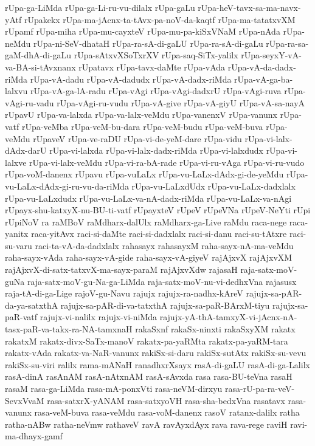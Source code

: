 {rUpa-ga-LiMda
rUpa-ga-Li-ru-vu-dilalx
rUpa-gaLu
rUpa-heV-tavx-sa-ma-navx-yAtf
rUpakekx
rUpa-ma-jAcnx-ta-tAvx-pa-noV-da-kaqtf
rUpa-ma-tatatxvXM
rUpamf
rUpa-miha
rUpa-mu-cayxteV
rUpa-mu-pa-kiSxVNaM
rUpa-nAda
rUpa-neMdu
rUpa-ni-SeV-dhataH
rUpa-ra-sA-di-gaLU
rUpa-ra-sA-di-gaLu
rUpa-ra-sa-gaM-dhA-di-gaLu
rUpa-sAtxvXSoTxrXV
rUpa-saq-SiTx-yalilx
rUpa-seyxY-vA-va-BA-si-tAvxnanx
rUpatavx
rUpa-tavx-daMte
rUpa-vAda
rUpa-vA-da-dadx-riMda
rUpa-vA-dadu
rUpa-vA-dadudx
rUpa-vA-dadx-riMda
rUpa-vA-ga-ba-lalxvu
rUpa-vA-ga-lA-radu
rUpa-vAgi
rUpa-vAgi-dadxrU
rUpa-vAgi-ruva
rUpa-vAgi-ru-vadu
rUpa-vAgi-ru-vudu
rUpa-vA-give
rUpa-vA-giyU
rUpa-vA-sa-nayA
rUpavU
rUpa-va-lalxda
rUpa-va-lalx-veMdu
rUpa-vanenxV
rUpa-vanunx
rUpa-vatf
rUpa-veMba
rUpa-veM-bu-dara
rUpa-veM-budu
rUpa-veM-buva
rUpa-veMdu
rUpaveV
rUpa-ve-raDU
rUpa-vi-de-yeM-dare
rUpa-vidu
rUpa-vi-lalx-dAdx-darU
rUpa-vi-lalxda
rUpa-vi-lalx-dadx-riMda
rUpa-vi-lalxdudx
rUpa-vi-lalxve
rUpa-vi-lalx-veMdu
rUpa-vi-ra-bA-rade
rUpa-vi-ru-vAga
rUpa-vi-ru-vudo
rUpa-voM-danenx
rUpavu
rUpa-vuLaLx
rUpa-vu-LaLx-dAdx-gi-de-yeMdu
rUpa-vu-LaLx-dAdx-gi-ru-vu-da-riMda
rUpa-vu-LaLxdUdx
rUpa-vu-LaLx-dadxlalx
rUpa-vu-LaLxdudx
rUpa-vu-LaLx-va-nA-dadx-riMda
rUpa-vu-LaLx-va-nAgi
rUpayx-shu-katxyX-nu-BU-ti-vatf
rUpayxteV
rUpeV
rUpeVNa
rUpeV-NeYti
rUpi
rUpiNoV
ra
raMBoV
raMdharx-dalUlx
raMdharx-ga-Live
raMdu
raca-nege
raca-yanitx
raca-yitAvx
raci-si-daMte
raci-si-dadxlalx
raci-si-danu
raci-su-tAtxre
raci-su-varu
raci-ta-vA-da-dadxlalx
rahasayx
rahasayxM
raha-sayx-nA-ma-veMdu
raha-sayx-vAda
raha-sayx-vA-gide
raha-sayx-vA-giyeV
rajAjxvX
rajAjxvXM
rajAjxvX-di-satx-tatxvX-ma-sayx-paraM
rajAjxvXdw
rajasaH
raja-satx-moV-guNa
raja-satx-moV-gu-Na-ga-LiMda
raja-satx-moV-nu-vi-dedhxVna
rajasusx
raja-tA-di-ga-Lige
rajoV-gu-Navu
rajujx
rajujx-ra-nadhx-kAreV
rajujx-sa-pAR-da-ya-satxthA
rajujx-sa-pAR-di-va-tatxthA
rajujx-sa-paR-BArxM-tiyu
rajujx-sa-paR-vatf
rajujx-vi-nalilx
rajujx-vi-niMda
rajujx-yA-thA-tamxyX-vi-jAcnx-nA-tasx-paR-va-takx-ra-NA-tamxnaH
rakaSxnf
rakaSx-ninxti
rakaSxyXM
rakatx
rakatxM
rakatx-divx-SaTx-manoV
rakatx-pa-yaRMta
rakatx-pa-yaRM-tara
rakatx-vAda
rakatx-va-NaR-vanunx
rakiSx-si-daru
rakiSx-sutAtx
rakiSx-su-vevu
rakiSx-su-viri
ralilx
rama-mANaH
ranadhxrXsayx
rasA-di-gaLU
rasA-di-ga-Lalilx
rasA-dinA
rasAnAM
rasA-nAtxnAM
rasA-sAvxda
rasa
rasa-BU-teVna
rasaH
rasaM
rasa-ga-LiMda
rasa-mA-ponxVti
rasa-neVM-dirxyu
rasa-rU-pa-ra-veV-SevxVvaM
rasa-satxrX-yANAM
rasa-satxyoVH
rasa-sha-bedxVna
rasatavx
rasa-vanunx
rasa-veM-buva
rasa-veMdu
rasa-voM-danenx
rasoV
ratanx-dalilx
ratha
ratha-nABw
ratha-neVmw
rathaveV
ravA
ravAyxdAyx
rava
rava-rege
raviH
ravi-ma-dhayx-gamf
}
